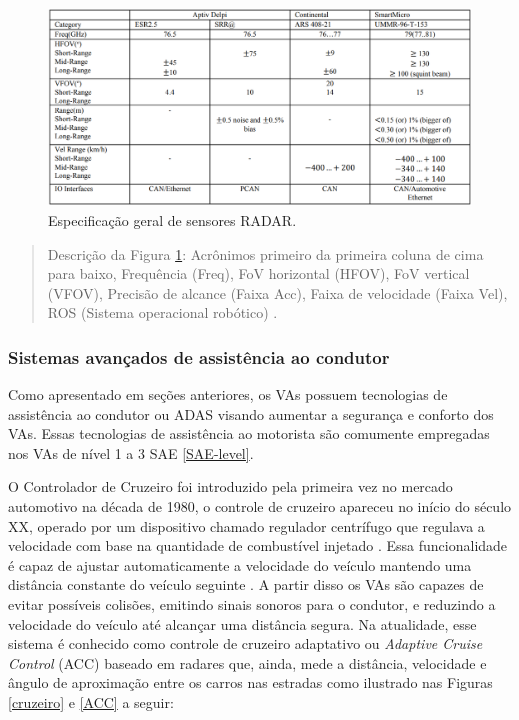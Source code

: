 \begin{figure}[H]
\centering
\includegraphics[width=\textwidth]{Figures/radar-table.png}
\caption{Especificação geral de sensores RADAR.}
\label{tabela-radar}
\end{figure}

\begin{quote}

Descrição da Figura \ref{tabela-radar}:  Acrônimos primeiro da primeira coluna de cima para baixo, Frequência (Freq), FoV horizontal (HFOV), FoV vertical (VFOV), Precisão de alcance (Faixa Acc), Faixa de velocidade (Faixa Vel), ROS (Sistema operacional robótico) \cite{sensors}.
\end{quote}


\subsubsection{Sistemas avançados de assistência ao condutor}


Como apresentado em seções anteriores, os VAs possuem tecnologias de assistência ao condutor ou ADAS visando aumentar a segurança e conforto dos VAs. Essas tecnologias de assistência ao motorista são comumente empregadas nos VAs de nível 1 a 3 SAE \ref{SAE-level}.


O Controlador de Cruzeiro foi introduzido pela primeira vez no mercado automotivo na década de 1980, o controle de cruzeiro apareceu no início do século XX, operado por um dispositivo chamado regulador centrífugo que regulava a velocidade com base na quantidade de combustível injetado \cite{caio}. Essa funcionalidade é capaz de ajustar automaticamente a velocidade do veículo mantendo uma distância constante do veículo seguinte \cite{sensors-yet}.
A partir disso os VAs são capazes de evitar possíveis colisões, emitindo sinais sonoros para o condutor, e reduzindo a velocidade do veículo até alcançar uma distância segura. Na atualidade, esse sistema é conhecido como controle de cruzeiro adaptativo ou \textit{Adaptive Cruise Control} (ACC) baseado em radares que, ainda, mede a distância, velocidade e ângulo de aproximação entre os carros nas estradas como ilustrado nas Figuras \ref{cruzeiro} e \ref{ACC} a seguir:

